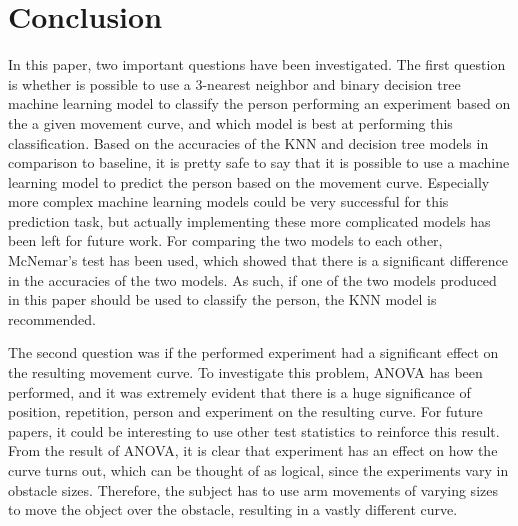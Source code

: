 \documentclass[11pt, fleqn, titlepage]{article}
\begin{document}
\section{Conclusion}

In this paper, two important questions have been investigated. The first question is whether is possible to use a 3-nearest neighbor and binary decision tree machine learning model to classify the person performing an experiment based on the a given movement curve, and which model is best at performing this classification. Based on the accuracies of the KNN and decision tree models in comparison to baseline, it is pretty safe to say that it is possible to use a machine learning model to predict the person based on the movement curve. Especially more complex machine learning models could be very successful for this prediction task, but actually implementing these more complicated models has been left for future work. For comparing the two models to each other, McNemar's test has been used, which showed that there is a significant difference in the accuracies of the two models. As such, if one of the two models produced in this paper should be used to classify the person, the KNN model is recommended.

The second question was if the performed experiment had a significant effect on the resulting movement curve. To investigate this problem, ANOVA has been performed, and it was extremely evident that there is a huge significance of position, repetition, person and experiment on the resulting curve. For future papers, it could be interesting to use other test statistics to reinforce this result. From the result of ANOVA, it is clear that experiment has an effect on how the curve turns out, which can be thought of as logical, since the experiments vary in obstacle sizes. Therefore, the subject has to use arm movements of varying sizes to move the object over the obstacle, resulting in a vastly different curve.
\newpage


\end{document}
